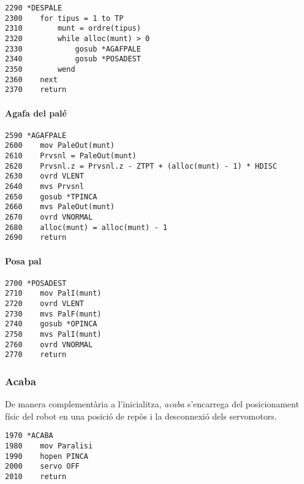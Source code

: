 \begin{verbatim}
2290 *DESPALE
2300    for tipus = 1 to TP
2310        munt = ordre(tipus)
2320        while alloc(munt) > 0
2330            gosub *AGAFPALE
2340            gosub *POSADEST
2350        wend
2360    next
2370    return
\end{verbatim}

\paragraph{Agafa del palé}
\begin{verbatim}
2590 *AGAFPALE
2600    mov PaleOut(munt)
2610    Prvsnl = PaleOut(munt)
2620    Prvsnl.z = Prvsnl.z - ZTPT + (alloc(munt) - 1) * HDISC
2630    ovrd VLENT
2640    mvs Prvsnl
2650    gosub *TPINCA
2660    mvs PaleOut(munt)
2670    ovrd VNORMAL
2680    alloc(munt) = alloc(munt) - 1
2690    return
\end{verbatim}

\paragraph{Posa pal}
\begin{verbatim}
2700 *POSADEST
2710    mov PalI(munt)
2720    ovrd VLENT
2730    mvs PalF(munt)
2740    gosub *OPINCA
2750    mvs PalI(munt)
2760    ovrd VNORMAL
2770    return
\end{verbatim}

\subsubsection{Acaba}
De manera complementària a l'inicialitza, \emph{acaba} s'encarrega del posicionament
físic del robot en una posició de repòs i la desconnexió dels servomotors.

\begin{verbatim}
1970 *ACABA
1980    mov Paralisi
1990    hopen PINCA
2000    servo OFF
2010    return
\end{verbatim}

